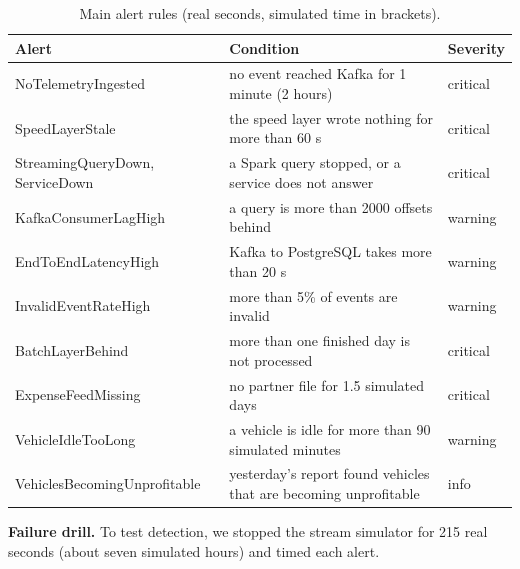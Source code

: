 \begin{table}[!htb]
\centering\small
\caption{Main alert rules (real seconds, simulated time in brackets).}
\label{tab:alerts}
\begin{tabularx}{\textwidth}{@{}P{4.7cm} L P{1.5cm}@{}}
\toprule
\textbf{Alert} & \textbf{Condition} & \textbf{Severity} \\
\midrule
NoTelemetryIngested & no event reached Kafka for 1 minute (2 hours) & critical \\
SpeedLayerStale & the speed layer wrote nothing for more than 60 s & critical \\
StreamingQueryDown, ServiceDown & a Spark query stopped, or a service does not answer & critical \\
KafkaConsumerLagHigh & a query is more than 2000 offsets behind & warning \\
EndToEndLatencyHigh & Kafka to PostgreSQL takes more than 20 s & warning \\
InvalidEventRateHigh & more than 5\% of events are invalid & warning \\
BatchLayerBehind & more than one finished day is not processed & critical \\
ExpenseFeedMissing & no partner file for 1.5 simulated days & critical \\
VehicleIdleTooLong & a vehicle is idle for more than 90 simulated minutes & warning \\
VehiclesBecomingUnprofitable & yesterday's report found vehicles that are becoming unprofitable & info \\
\bottomrule
\end{tabularx}
\end{table}

\textbf{Failure drill.} To test detection, we stopped the stream simulator for 215 real seconds (about
seven simulated hours) and timed each alert.
\DrillText{}
